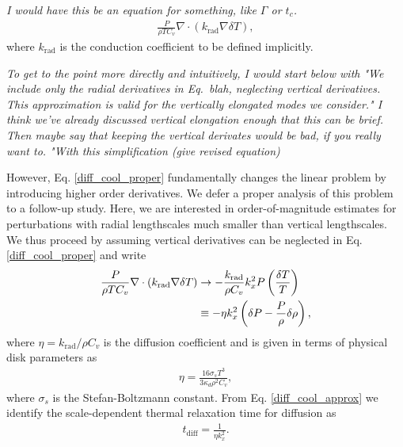 \emph{I would have this be an equation for something, like $\Gamma$ or $t_c$.}
\begin{align}\label{diff_cool_proper}
  \frac{P}{\rho T C_v} \nabla\cdot\left(k_\mathrm{rad}\nabla\delta
    T\right),  
\end{align}
where $k_\mathrm{rad}$ is the conduction coefficient to be defined
implicitly. 

\emph{To get to the point more directly and intuitively, I would start below with "We include only the radial derivatives in Eq.\ blah, neglecting vertical derivatives.  This approximation is valid for the vertically elongated modes we consider."  I think we've already discussed vertical elongation enough that this can be brief.  Then maybe say that keeping the vertical derivates would be bad, if you really want to.  "With this simplification (give revised equation)}

However, Eq. \ref{diff_cool_proper} fundamentally changes the linear
problem by introducing higher order derivatives. We defer a proper
analysis of this problem to a follow-up study. Here, we are interested
in order-of-magnitude estimates for perturbations with radial
lengthscales much smaller than vertical lengthscales. We thus proceed 
by assuming vertical derivatives can be neglected in 
Eq. \ref{diff_cool_proper} and write  
\begin{align}\label{diff_cool_approx}
  \frac{P}{\rho T C_v} \nabla\cdot\left(k_\mathrm{rad}\nabla\delta
    T\right) &\to -\frac{k_\mathrm{rad}}{\rho
    C_v}k_x^2P\left(\frac{\delta T}{T}\right)\notag\\
  &\equiv -\eta k_x^2 \left(\delta P - \frac{P}{\rho}\delta\rho\right), 
\end{align}
 where $\eta=k_\mathrm{rad}/\rho C_v$ is
the diffusion coefficient and 
is given in terms of physical disk parameters as 
\begin{align}\label{eta_def}
  \eta = \frac{16\sigma_s T^3}{3\kappa_d\rho^2 C_v}, 
\end{align}
where $\sigma_s$ is the Stefan-Boltzmann constant. 
From Eq. \ref{diff_cool_approx} we identify the scale-dependent thermal relaxation
time for diffusion as 
\begin{align}\label{tc_diff_cool} 
  t_\mathrm{diff} = \frac{1}{\eta k_x^2}.%
\end{align}


